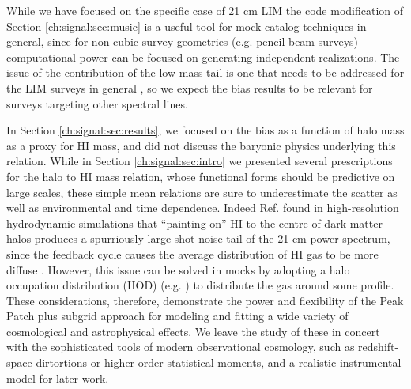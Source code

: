 While we have focused on the specific case of 21 cm LIM the code modification of Section \ref{ch:signal:sec:music} is a useful tool for mock catalog techniques in general, since for non-cubic survey geometries (e.g. pencil beam surveys) computational power can be focused on generating independent realizations. The issue of the contribution of the low mass tail is one that needs to be addressed for the LIM surveys in general \citep{statusreport}, so we expect the bias results to be relevant for surveys targeting other spectral lines.

In Section \ref{ch:signal:sec:results}, we focused on the bias as a function of halo mass as a proxy for HI mass, and did not discuss the baryonic physics underlying this relation. While in Section \ref{ch:signal:sec:intro} we presented several prescriptions for the halo to HI mass relation, whose functional forms should be predictive on large scales, these simple mean relations are sure to underestimate the scatter as well as environmental and time dependence. Indeed Ref. \cite{illustristng21cm} found in high-resolution hydrodynamic simulations that ``painting on'' HI to the centre of dark matter halos produces a spurriously large shot noise tail of the 21 cm power spectrum, since the feedback cycle causes the average distribution of HI gas to be more diffuse \citep{firehi}. However, this issue can be solved in mocks by adopting a halo occupation distribution (HOD) (e.g. \citep{maneraetal2013}) to distribute the gas around some profile. These considerations, therefore, demonstrate the power and flexibility of the Peak Patch plus subgrid approach for modeling and fitting a wide variety of cosmological and astrophysical effects. We leave the study of these in concert with the sophisticated tools of modern observational cosmology, such as redshift-space dirtortions or higher-order statistical moments, and a realistic instrumental model for later work.